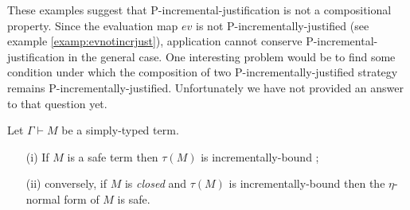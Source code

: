 These examples suggest that P-incremental-justification is not a compositional property. Since the
 evaluation map $ev$ is not P-incrementally-justified (see example \ref{examp:evnotincrjust}),
application cannot conserve P-incremental-justification in the general case. One interesting problem would be to find some condition under which  the composition of two P-incrementally-justified strategy remains
P-incrementally-justified.
Unfortunately we have not provided an answer to that question yet.


\begin{lem}
\label{lem:safe_imp_incrbound} Let $\Gamma \vdash M$ be a
simply-typed term.
\begin{itemize}
\item[(i)] If $M$ is a safe term then $\tau(M)$ is incrementally-bound ;
\item[(ii)] conversely, if $M$ is \emph{closed} and $\tau(M)$ is incrementally-bound then the $\eta$-normal form of $M$ is safe.
\end{itemize}
\end{lem}
